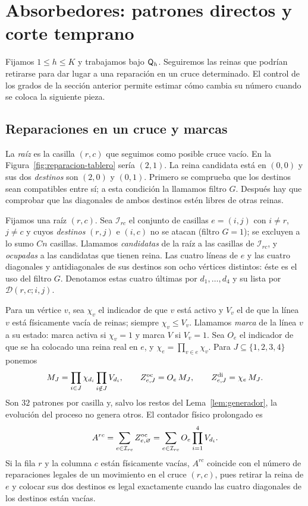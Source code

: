 \section{Absorbedores: patrones directos y corte temprano}\label{sec:absorbedores}

Fijamos $1\le h\le K$ y trabajamos bajo $\mathsf{Q}_h$. Seguiremos las reinas que
podrían retirarse para dar lugar a una reparación en un cruce determinado.
El control de los grados de la sección anterior permite estimar cómo cambia
su número cuando se coloca la siguiente pieza.

\subsection{Reparaciones en un cruce y marcas}

La \emph{raíz} es la casilla $(r,c)$ que seguimos como posible cruce vacío. En la
Figura~\ref{fig:reparacion-tablero} sería $(2,1)$. La reina candidata está en
$(0,0)$ y sus dos \emph{destinos} son $(2,0)$ y $(0,1)$. Primero se comprueba
que los destinos sean compatibles entre sí; a esta condición la llamamos filtro $G$.
Después hay que comprobar que las diagonales de ambos destinos estén libres de otras reinas.

Fijamos una raíz $(r,c)$. Sea $\mathcal I_{rc}$ el conjunto de casillas $e=(i,j)$ con $i\ne r$,
$j\ne c$ y cuyos \emph{destinos} $(r,j)$ e $(i,c)$ no se atacan (filtro $G=1$); se excluyen a lo
sumo $Cn$ casillas. Llamamos \emph{candidatas} de la raíz a las casillas de $\mathcal I_{rc}$, y
\emph{ocupadas}
a las candidatas que tienen reina. Las cuatro líneas de $e$ y las cuatro diagonales y antidiagonales de sus
destinos son ocho vértices distintos: éste es el uso del filtro $G$. Denotamos estas cuatro
últimas por $d_1,\dots,d_4$ y su lista por $\mathcal D(r,c;i,j)$.

Para un vértice $v$, sea $\chi_v$ el indicador de que $v$ está activo y $V_v$ el de que la línea
$v$ está físicamente vacía de reinas; siempre $\chi_v\le V_v$. Llamamos \emph{marca} de la
línea $v$ a su estado: marca activa si $\chi_v=1$ y marca $V$ si $V_v=1$. Sea $O_e$ el indicador de que se
ha colocado una reina real en $e$, y $\chi_e=\prod_{v\in e}\chi_v$. Para $J\subseteq\{1,2,3,4\}$
ponemos
\begin{equation}\label{eq:patrones}
 M_J=\prod_{i\in J}\chi_{d_i}\prod_{i\notin J}V_{d_i},\qquad
 Z^{\mathrm{oc}}_{e,J}=O_e\,M_J,\qquad Z^{\mathrm{di}}_{e,J}=\chi_e\,M_J .
\end{equation}
Son $32$ patrones por casilla y, salvo los restos del Lema~\ref{lem:generador}, la evolución del
proceso no genera otros. El contador
físico prolongado es
\[
 A^{rc}=\sum_{e\in\mathcal I_{rc}}Z^{\mathrm{oc}}_{e,\varnothing}=\sum_{e\in\mathcal I_{rc}}O_e\prod_{i=1}^4V_{d_i}.
\]
Si la fila $r$ y la columna $c$ están físicamente vacías, $A^{rc}$ coincide con el número de
reparaciones legales de un movimiento en el cruce $(r,c)$, pues retirar la reina de $e$ y colocar
sus dos destinos es legal exactamente cuando las cuatro diagonales de los destinos están vacías.

